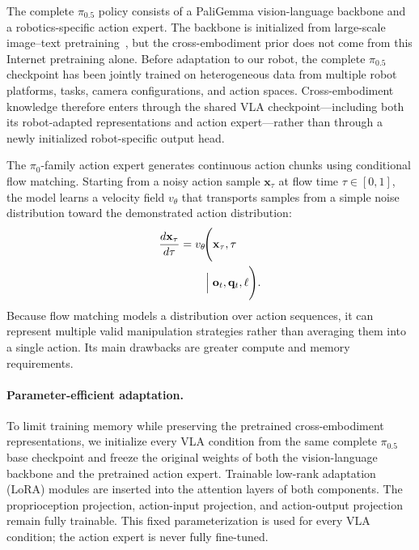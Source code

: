 \documentclass[10pt,conference]{IEEEtran}
\newcommand{\pio}{\ensuremath{\pi_0}}
\begin{document}
The complete $\pi_{0.5}$ policy consists of a PaliGemma vision-language
backbone and a robotics-specific action expert. The backbone is initialized
from large-scale image--text pretraining~\cite{beyer2024paligemma}, but the
cross-embodiment prior does not come from this Internet pretraining alone.
Before adaptation to our robot, the complete $\pi_{0.5}$ checkpoint has been
jointly trained on heterogeneous data from multiple robot platforms, tasks,
camera configurations, and action spaces. Cross-embodiment knowledge therefore
enters through the shared VLA checkpoint---including both its robot-adapted
representations and action expert---rather than through a newly initialized
robot-specific output head.

The \pio{}-family action expert generates continuous action chunks using
conditional flow matching. Starting from a noisy action sample
\(\mathbf{x}_\tau\) at flow time \(\tau\in[0,1]\), the model learns a velocity
field \(v_\theta\) that transports samples from a simple noise distribution
toward the demonstrated action distribution:
\begin{equation}
\begin{aligned}
    \frac{d\mathbf{x}_\tau}{d\tau}
    &=
    v_\theta\!\Biggl(
    \mathbf{x}_\tau,\tau
    \\
    &\qquad\Bigm|
    \mathbf{o}_t,\mathbf{q}_t,\ell
    \Biggr).
\end{aligned}
\end{equation}
Because flow matching models a distribution over action sequences, it can
represent multiple valid manipulation strategies rather than averaging them
into a single action. Its main drawbacks are greater compute and memory
requirements.

\paragraph{Parameter-efficient adaptation.}
To limit training memory while preserving the pretrained cross-embodiment
representations, we initialize every VLA condition from the same complete
$\pi_{0.5}$ base checkpoint and freeze the original weights of both the
vision-language backbone and the pretrained action expert. Trainable low-rank
adaptation (LoRA) modules are inserted into the attention layers of both
components. The proprioception projection, action-input projection, and
action-output projection remain fully trainable. This fixed parameterization is
used for every VLA condition; the action expert is never fully fine-tuned.
\end{document}
